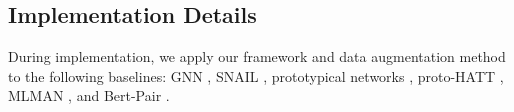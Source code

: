 \subsection{Implementation Details}

During implementation, we apply our framework and data augmentation method to the following baselines:
GNN \cite{gnn},
SNAIL \cite{snail},
prototypical networks \cite{proto},
proto-HATT \cite{hatt},
MLMAN \cite{ye-ling-2019-multi}, and
Bert-Pair \cite{gao-etal-2019-fewrel}.

